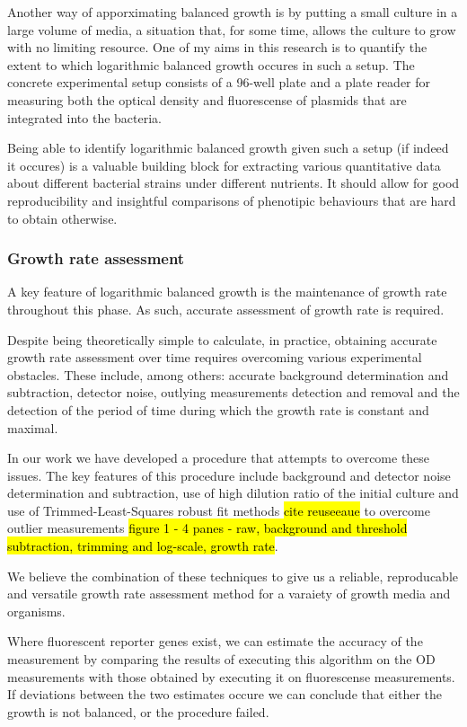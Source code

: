 \documentclass{report}
\begin{document}
Another way of apporximating balanced growth is by putting a small culture in a large volume of media, a situation that, for some time, allows the culture to grow with no limiting resource.
One of my aims in this research is to quantify the extent to which logarithmic balanced growth occures in such a setup.
The concrete experimental setup consists of a 96-well plate and a plate reader for measuring both the optical density and fluorescense of plasmids that are integrated into the bacteria.

Being able to identify logarithmic balanced growth given such a setup (if indeed it occures) is a valuable building block for extracting various quantitative data about different bacterial strains under different nutrients.
It should allow for good reproducibility and insightful comparisons of phenotipic behaviours that are hard to obtain otherwise.
\subsubsection{Growth rate assessment}
\label{growth-rate}
A key feature of logarithmic balanced growth is the maintenance of growth rate throughout this phase.
As such, accurate assessment of growth rate is required.

Despite being theoretically simple to calculate, in practice, obtaining accurate growth rate assessment over time requires overcoming various experimental obstacles.
These include, among others: accurate background determination and subtraction, detector noise, outlying measurements detection and removal and the detection of the period of time during which the growth rate is constant and maximal.

In our work we have developed a procedure that attempts to overcome these issues.
The key features of this procedure include background and detector noise determination and subtraction, use of high dilution ratio of the initial culture and use of Trimmed-Least-Squares robust fit methods \hl{cite reuseeaue} to overcome outlier measurements \hl{figure 1 - 4 panes - raw, background and threshold subtraction, trimming and log-scale, growth rate}.

We believe the combination of these techniques to give us a reliable, reproducable and versatile growth rate assessment method for a varaiety of growth media and organisms.

Where fluorescent reporter genes exist, we can estimate the accuracy of the measurement by comparing the results of executing this algorithm on the OD measurements with those obtained by executing it on fluorescense measurements.
If deviations between the two estimates occure we can conclude that either the growth is not balanced, or the procedure failed.
\end{document}
